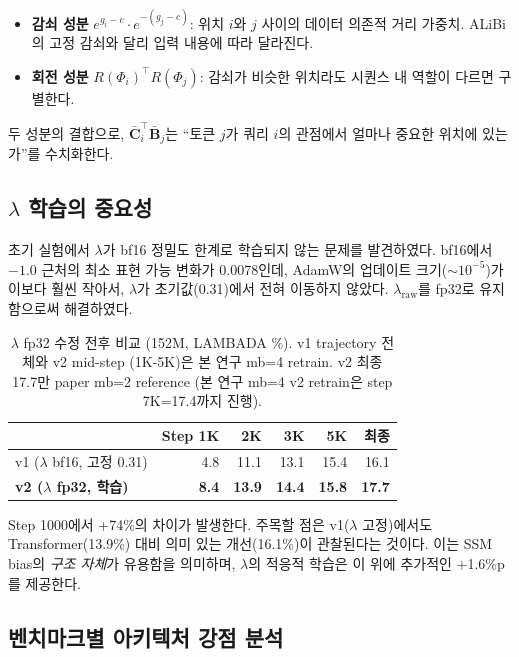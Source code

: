 \documentclass[11pt]{article}
\begin{document}
\begin{itemize}[leftmargin=*]
\item \textbf{감쇠 성분} $e^{g_i-c} \cdot e^{-(g_j-c)}$: 위치 $i$와 $j$ 사이의 데이터 의존적 거리 가중치. ALiBi의 고정 감쇠와 달리 입력 내용에 따라 달라진다.
\item \textbf{회전 성분} $R(\Phi_i)^\top R(\Phi_j)$: 감쇠가 비슷한 위치라도 시퀀스 내 역할이 다르면 구별한다.
\end{itemize}

두 성분의 결합으로, $\bar{\mathbf{C}}_i^\top \bar{\mathbf{B}}_j$는 ``토큰 $j$가 쿼리 $i$의 관점에서 얼마나 중요한 위치에 있는가''를 수치화한다.

\subsection{$\lambda$ 학습의 중요성}
\label{sec:lambda}

초기 실험에서 $\lambda$가 bf16 정밀도 한계로 학습되지 않는 문제를 발견하였다. bf16에서 $-1.0$ 근처의 최소 표현 가능 변화가 0.0078인데, AdamW의 업데이트 크기($\sim$$10^{-5}$)가 이보다 훨씬 작아서, $\lambda$가 초기값(0.31)에서 전혀 이동하지 않았다. $\lambda_{\text{raw}}$를 fp32로 유지함으로써 해결하였다.

\begin{table}[h]
\centering\small
\caption{$\lambda$ fp32 수정 전후 비교 (152M, LAMBADA \%). v1 trajectory 전체와 v2 mid-step (1K-5K)은 본 연구 mb=4 retrain. v2 최종 17.7만 paper mb=2 reference (본 연구 mb=4 v2 retrain은 step 7K=17.4까지 진행).}
\begin{tabular}{lrrrrr}
\toprule
& \textbf{Step 1K} & \textbf{2K} & \textbf{3K} & \textbf{5K} & \textbf{최종} \\
\midrule
v1 ($\lambda$ bf16, 고정 0.31) & 4.8 & 11.1 & 13.1 & 15.4 & 16.1 \\
\textbf{v2 ($\lambda$ fp32, 학습)} & \textbf{8.4} & \textbf{13.9} & \textbf{14.4} & \textbf{15.8} & \textbf{17.7} \\
\bottomrule
\end{tabular}
\end{table}

Step 1000에서 +74\%의 차이가 발생한다. 주목할 점은 v1($\lambda$ 고정)에서도 Transformer(13.9\%) 대비 의미 있는 개선(16.1\%)이 관찰된다는 것이다. 이는 SSM bias의 \emph{구조 자체}가 유용함을 의미하며, $\lambda$의 적응적 학습은 이 위에 추가적인 +1.6\%p를 제공한다.

\subsection{벤치마크별 아키텍처 강점 분석}
\label{sec:bench_analysis}
\end{document}
